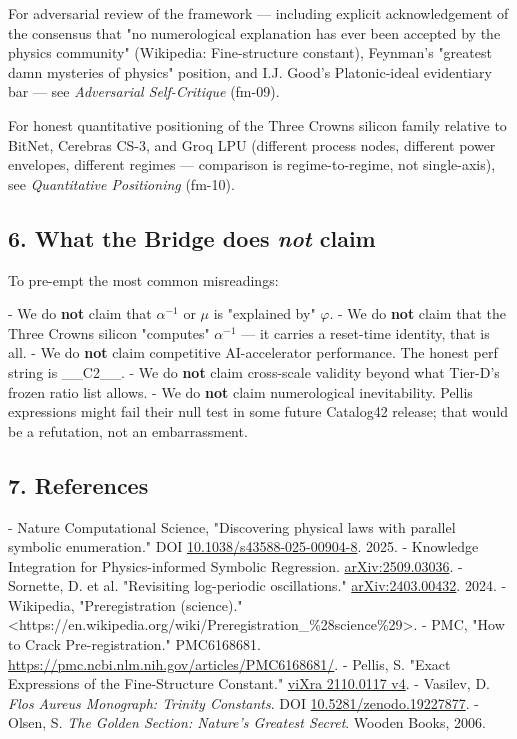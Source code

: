For adversarial review of the framework --- including explicit acknowledgement of the consensus that "no numerological explanation has ever been accepted by the physics community" (Wikipedia: Fine-structure constant), Feynman's "greatest damn mysteries of physics" position, and I.J. Good's Platonic-ideal evidentiary bar --- see \textit{Adversarial Self-Critique} (fm-09).

For honest quantitative positioning of the Three Crowns silicon family relative to BitNet, Cerebras CS-3, and Groq LPU (different process nodes, different power envelopes, different regimes --- comparison is regime-to-regime, not single-axis), see \textit{Quantitative Positioning} (fm-10).

\subsection{6. What the Bridge does \textit{not} claim}

To pre-empt the most common misreadings:

- We do \textbf{not} claim that $\alpha^{-1}$ or $\mu$ is "explained by" $\varphi$.
- We do \textbf{not} claim that the Three Crowns silicon "computes" $\alpha^{-1}$ --- it carries a reset-time identity, that is all.
- We do \textbf{not} claim competitive AI-accelerator performance. The honest perf string is \_\_C2\_\_.
- We do \textbf{not} claim cross-scale validity beyond what Tier-D's frozen ratio list allows.
- We do \textbf{not} claim numerological inevitability. Pellis expressions might fail their null test in some future Catalog42 release; that would be a refutation, not an embarrassment.

\subsection{7. References}

- Nature Computational Science, "Discovering physical laws with parallel symbolic enumeration." DOI \href{https://www.nature.com/articles/s43588-025-00904-8}{10.1038/s43588-025-00904-8}. 2025.
- Knowledge Integration for Physics-informed Symbolic Regression. \href{https://arxiv.org/abs/2509.03036}{arXiv:2509.03036}.
- Sornette, D. et al. "Revisiting log-periodic oscillations." \href{https://arxiv.org/abs/2403.00432}{arXiv:2403.00432}. 2024.
- Wikipedia, "Preregistration (science)." <https://en.wikipedia.org/wiki/Preregistration\_\%28science\%29>.
- PMC, "How to Crack Pre-registration." PMC6168681. \href{https://pmc.ncbi.nlm.nih.gov/articles/PMC6168681/}{https://pmc.ncbi.nlm.nih.gov/articles/PMC6168681/}.
- Pellis, S. "Exact Expressions of the Fine-Structure Constant." \href{https://vixra.org/abs/2110.0117}{viXra 2110.0117 v4}.
- Vasilev, D. \textit{Flos Aureus Monograph: Trinity Constants}. DOI \href{https://zenodo.org/doi/10.5281/zenodo.19227877}{10.5281/zenodo.19227877}.
- Olsen, S. \textit{The Golden Section: Nature's Greatest Secret}. Wooden Books, 2006.
